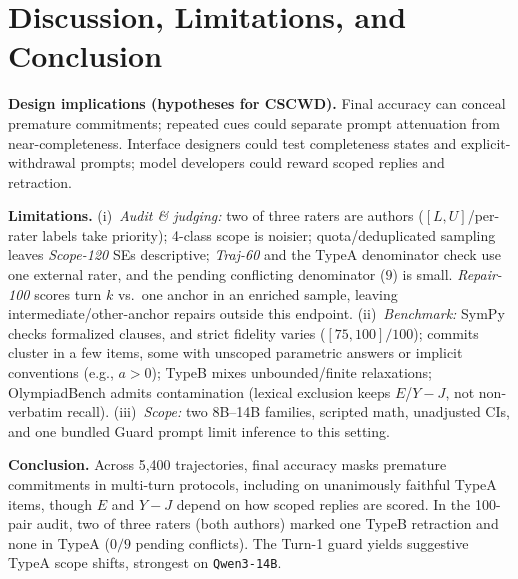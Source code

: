 \documentclass[conference,letterpaper,10pt]{IEEEtran}
\newcommand{\TA}{TypeA}
\newcommand{\TB}{TypeB}
\begin{document}
\section{Discussion, Limitations, and Conclusion}

\textbf{Design implications (hypotheses for CSCWD).} Final accuracy can conceal premature commitments; repeated cues could separate prompt attenuation from near-completeness. Interface designers could test completeness states and explicit-withdrawal prompts; model developers could reward scoped replies and retraction.

\textbf{Limitations.} (i)~\emph{Audit \& judging:} two of three raters are authors ($[L,U]$/per-rater labels take priority); 4-class scope is noisier; quota/deduplicated sampling leaves \emph{Scope-120} SEs descriptive; \emph{Traj-60} and the \TA{} denominator check use one external rater, and the pending conflicting denominator ($9$) is small. \emph{Repair-100} scores turn $k$ vs.\ one anchor in an enriched sample, leaving intermediate/other-anchor repairs outside this endpoint. (ii)~\emph{Benchmark:} SymPy checks formalized clauses, and strict fidelity varies ($[75,100]/100$); commits cluster in a few items, some with unscoped parametric answers or implicit conventions (e.g., $a{>}0$); \TB{} mixes unbounded/finite relaxations; OlympiadBench admits contamination (lexical exclusion keeps $E$/$Y{-}J$, not non-verbatim recall). (iii)~\emph{Scope:} two 8B--14B families, scripted math, unadjusted CIs, and one bundled Guard prompt limit inference to this setting.

\textbf{Conclusion.} Across 5,400 trajectories, final accuracy masks premature commitments in multi-turn protocols, including on unanimously faithful \TA{} items, though $E$ and $Y{-}J$ depend on how scoped replies are scored. In the 100-pair audit, two of three raters (both authors) marked one \TB{} retraction and none in \TA{} ($0/9$ pending conflicts). The Turn-1 guard yields suggestive \TA{} scope shifts, strongest on \texttt{Qwen3-14B}.
\end{document}
